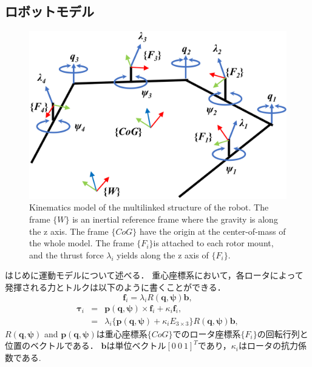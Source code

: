 \documentclass{jarticle}
\begin{document}
\subsection{ロボットモデル}
\begin{figure}[tb]
    \centering
    \includegraphics[width=0.6\columnwidth]{figs/hydrus_xi_kine_frame.eps}
    \caption{Kinematics model of the multilinked structure of the robot.
    The frame $\{W\}$ is an inertial reference frame where the gravity is along the z axis.
    The frame $\{CoG\}$ have the origin at the center-of-mass of the whole model.
    The frame $\{F_i\}$is attached to each rotor mount, and the thrust force $\lambda_i$ yields along the z axis of $\{F_i\}$.
    }
    \label{fig:hydrus_xi_Frame}
\end{figure}

はじめに運動モデルについて述べる．
重心座標系において，各ロータによって発揮される力とトルクは以下のように書くことができる．
\begin{equation}
    \bm{f}_i = \lambda_i R(\bm{q},\bm{\psi}) \bm{b} ,
\end{equation}
\begin{eqnarray}
    \bm{\tau}_i &=& \bm{p}(\bm{q},\bm{\psi}) \times \bm{f}_i + \kappa_i \bm{f}_i , \\
    &=& \lambda_i \{\bm{p}(\bm{q},\bm{\psi}) + \kappa_i E_{3\times3}\} R(\bm{q},\bm{\psi}) \bm{b} ,
\end{eqnarray}
$R(\bm{q},\bm{\psi})$ and $\bm{p}(\bm{q},\bm{\psi})$は重心座標系$\{CoG\}$でのロータ座標系$\{F_i\}$の回転行列と位置のベクトルである．
$\bm{b}$は単位ベクトル$[0 ~ 0 ~ 1]^T$であり，$\kappa_i$はロータの抗力係数である.
\end{document}
